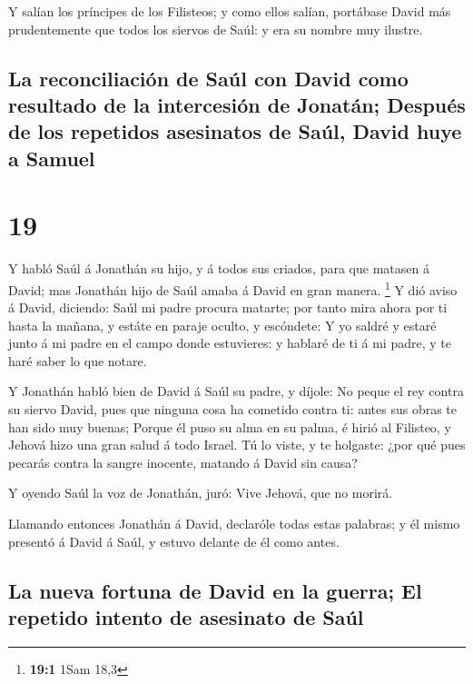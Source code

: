  Y salían los príncipes de los Filisteos; y como ellos
salían, portábase David más prudentemente que todos los siervos de Saúl:
y era su nombre muy ilustre.

\hypertarget{la-reconciliaciuxf3n-de-sauxfal-con-david-como-resultado-de-la-intercesiuxf3n-de-jonatuxe1n-despuuxe9s-de-los-repetidos-asesinatos-de-sauxfal-david-huye-a-samuel}{%
\subsection{La reconciliación de Saúl con David como resultado de la
intercesión de Jonatán; Después de los repetidos asesinatos de Saúl,
David huye a
Samuel}\label{la-reconciliaciuxf3n-de-sauxfal-con-david-como-resultado-de-la-intercesiuxf3n-de-jonatuxe1n-despuuxe9s-de-los-repetidos-asesinatos-de-sauxfal-david-huye-a-samuel}}

\hypertarget{section-18}{%
\section{19}\label{section-18}}

 Y habló Saúl á Jonathán su hijo, y á todos sus criados,
para que matasen á David; mas Jonathán hijo de Saúl amaba á David en
gran manera. \footnote{\textbf{19:1} 1Sam 18,3}  Y dió aviso
á David, diciendo: Saúl mi padre procura matarte; por tanto mira ahora
por ti hasta la mañana, y estáte en paraje oculto, y escóndete:
 Y yo saldré y estaré junto á mi padre en el campo donde
estuvieres: y hablaré de ti á mi padre, y te haré saber lo que notare.

 Y Jonathán habló bien de David á Saúl su padre, y díjole:
No peque el rey contra su siervo David, pues que ninguna cosa ha
cometido contra ti: antes sus obras te han sido muy buenas; 
Porque él puso su alma en su palma, é hirió al Filisteo, y Jehová hizo
una gran salud á todo Israel. Tú lo viste, y te holgaste: ¿por qué pues
pecarás contra la sangre inocente, matando á David sin causa?

 Y oyendo Saúl la voz de Jonathán, juró: Vive Jehová, que no
morirá.

 Llamando entonces Jonathán á David, declaróle todas estas
palabras; y él mismo presentó á David á Saúl, y estuvo delante de él
como antes.

\hypertarget{la-nueva-fortuna-de-david-en-la-guerra-el-repetido-intento-de-asesinato-de-sauxfal}{%
\subsection{La nueva fortuna de David en la guerra; El repetido intento
de asesinato de
Saúl}\label{la-nueva-fortuna-de-david-en-la-guerra-el-repetido-intento-de-asesinato-de-sauxfal}}

